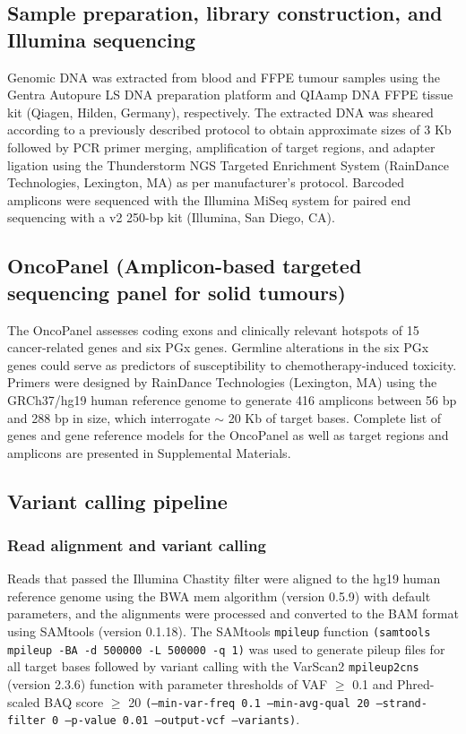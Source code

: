 \documentclass{bmcart}
\begin{document}
\subsection*{Sample preparation, library construction, and Illumina sequencing}
Genomic DNA was extracted from blood and FFPE tumour samples using the Gentra Autopure LS DNA preparation platform and QIAamp DNA FFPE tissue kit (Qiagen, Hilden, Germany), respectively. The extracted DNA was sheared according to a previously described protocol \cite{Bosdet2013} to obtain approximate sizes of 3 Kb followed by PCR primer merging, amplification of target regions, and adapter ligation using the Thunderstorm NGS Targeted Enrichment System (RainDance Technologies, Lexington, MA) as per manufacturer's protocol. Barcoded amplicons were sequenced with the Illumina MiSeq system for paired end sequencing with a v2 250-bp kit (Illumina, San Diego, CA).

\subsection*{OncoPanel (Amplicon-based targeted sequencing panel for solid tumours)}

The OncoPanel assesses coding exons and clinically relevant hotspots of 15 cancer-related genes and six PGx genes. Germline alterations in the six PGx genes could serve as predictors of susceptibility to chemotherapy-induced toxicity. Primers were designed by RainDance Technologies (Lexington, MA) using the GRCh37/hg19 human reference genome to generate 416 amplicons between 56 bp and 288 bp in size, which interrogate $\sim$ 20 Kb of target bases. Complete list of genes and gene reference models for the OncoPanel as well as target regions and amplicons are presented in Supplemental Materials.

\subsection*{Variant calling pipeline}

\subsubsection*{Read alignment and variant calling}

Reads that passed the Illumina Chastity filter were aligned to the hg19 human reference genome using the BWA mem algorithm (version 0.5.9) with default parameters, and the alignments were processed and converted to the BAM format using SAMtools (version 0.1.18). The SAMtools \texttt{mpileup} function \texttt{(samtools mpileup -BA -d 500000 -L 500000 -q 1)} was used to generate pileup files for all target bases followed by variant calling with the VarScan2 \texttt{mpileup2cns} (version 2.3.6) function with parameter thresholds of VAF $\geq$ 0.1 and Phred-scaled BAQ score $\geq$ 20 \texttt{(--min-var-freq 0.1 --min-avg-qual 20 --strand-filter 0 --p-value 0.01 --output-vcf --variants)}.
\end{document}
